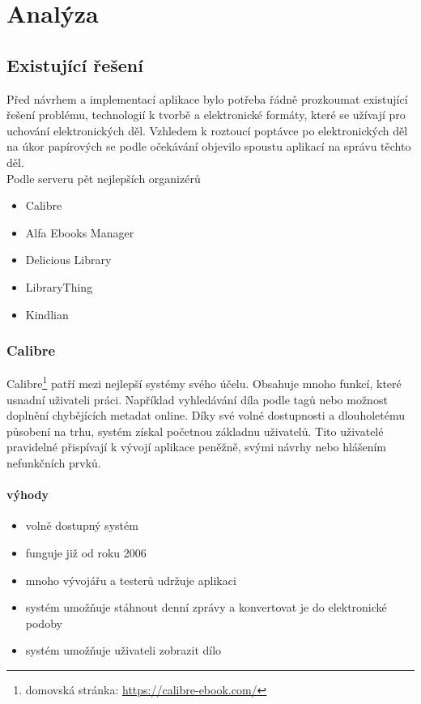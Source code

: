 \chapter{Analýza}

    \section{Existující řešení}
        Před návrhem a implementací aplikace bylo potřeba řádně prozkoumat existující řešení problému, technologií k tvorbě a elektronické formáty, které se užívají pro uchování elektronických děl. Vzhledem k roztoucí poptávce po elektronických děl na úkor papírových se podle očekávání objevilo spoustu aplikací na správu těchto děl.\\
        Podle serveru \cite{bookrunch} pět nejlepších organizérů
        \begin{itemize}
            \item Calibre
            \item Alfa Ebooks Manager
            \item Delicious Library
            \item LibraryThing
            \item Kindlian
        \end{itemize}

        \subsection{Calibre}
            Calibre\footnote{domovská stránka: \url{https://calibre-ebook.com/}} patří mezi nejlepší systémy svého účelu. Obsahuje mnoho funkcí, které usnadní uživateli práci. Například vyhledávání díla podle tagů nebo možnost doplnění chybějících metadat online. Díky své volné dostupnosti a dlouholetému působení na trhu, systém získal početnou základnu uživatelů. Tito uživatelé pravidelné přispívají k vývojí aplikace peněžně, svými návrhy nebo hlášením nefunkčních prvků.
            
            \subsubsection{výhody}
                \begin{itemize}
                    \item volně dostupný systém
                    \item funguje již od roku 2006
                    \item mnoho vývojářu a testerů udržuje aplikaci
                    \item systém umožňuje stáhnout denní zprávy a konvertovat je do elektronické podoby
                    \item systém umožňuje uživateli zobrazit dílo
                \end{itemize}
                
